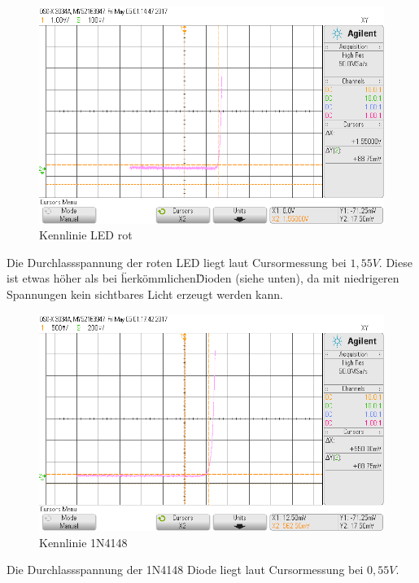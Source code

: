 \documentclass[12pt,a4paper,titlepage]{article}
\begin{document}
\begin{figure}[H]
  \centering
  \includegraphics[width=150mm]{kennlinie_led.png}
  \caption{Kennlinie LED rot}
  \label{Figure8.5.1}
\end{figure}

Die Durchlassspannung der roten LED liegt laut Cursormessung bei $1,55V$. Diese ist etwas höher als bei \"herkömmlichen\" Dioden (siehe unten), da mit niedrigeren Spannungen kein sichtbares Licht erzeugt werden kann.

\begin{figure}[H]
  \centering
  \includegraphics[width=150mm]{kennlinie_1n4148.png}
  \caption{Kennlinie 1N4148}
  \label{Figure8.5.2}
\end{figure}

Die Durchlassspannung der 1N4148 Diode liegt laut Cursormessung bei $0,55V$.
\end{document}
